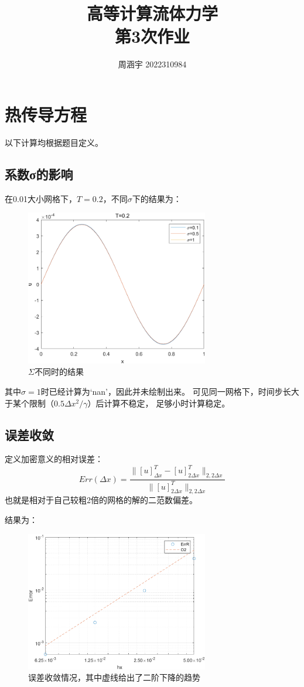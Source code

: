 \documentclass[UTF8,zihao=5]{ctexart} %
\title{{\bfseries\rmfamily\Huge{高等计算流体力学\hspace{1em}\\第3次作业}}}
\author{周涵宇 2022310984}
\date{}
\newcommand*{\inc}[0]{{\Delta}}
\begin{document}
\maketitle

\section{热传导方程}

以下计算均根据题目定义。

\subsection{系数σ的影响}

在0.01大小网格下，$T=0.2$，不同$\sigma$下的结果为：

\begin{figure}[H]
    \centering
    \includegraphics[width=8cm]{Sigmas.png}  %
    \caption{$\Sigma$不同时的结果}
    \label{fig:a}
\end{figure}

其中$\sigma=1$时已经计算为`nan'，因此并未绘制出来。
可见同一网格下，时间步长大于某个限制（$0.5\inc x^2/\gamma$）后计算不稳定，
足够小时计算稳定。

\subsection{误差收敛}

定义加密意义的相对误差：
$$
    Err(\inc x)=\frac{\|[u]^T_{\inc x}-[u]^T_{2\inc x}\|_{2,2\inc x}}{\|[u]^T_{2\inc x}\|_{2,2\inc x}}
$$
也就是相对于自己较粗2倍的网格的解的二范数偏差。

结果为：
\begin{figure}[H]
    \centering
    \includegraphics[width=8cm]{Errs.png}  %
    \caption{误差收敛情况，其中虚线给出了二阶下降的趋势}
    \label{fig:b}
\end{figure}
\end{document}

